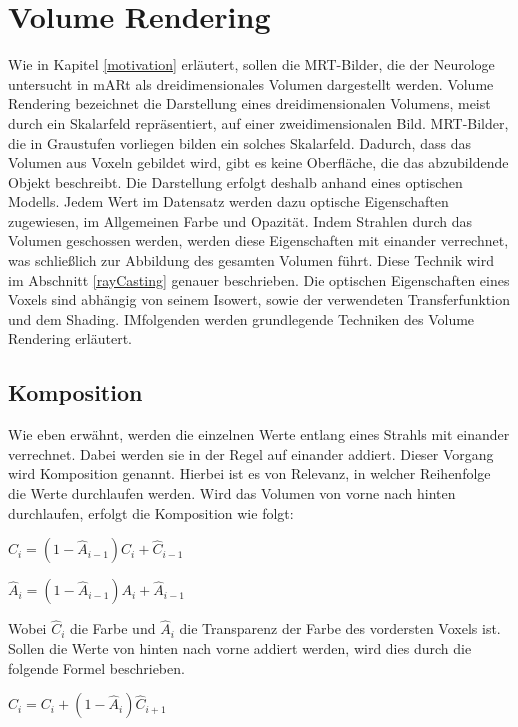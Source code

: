 \section{Volume Rendering}							  %
Wie in Kapitel \ref{motivation} erläutert, sollen die MRT-Bilder, die der Neurologe untersucht in mARt als dreidimensionales Volumen dargestellt werden. Volume Rendering bezeichnet die Darstellung eines dreidimensionalen Volumens, meist durch ein Skalarfeld repräsentiert, auf einer zweidimensionalen Bild. MRT-Bilder, die in Graustufen vorliegen bilden ein solches Skalarfeld. 
Dadurch, dass das Volumen aus Voxeln gebildet wird, gibt es keine Oberfläche, die das abzubildende Objekt beschreibt. Die Darstellung erfolgt deshalb anhand eines optischen Modells. Jedem Wert im Datensatz werden dazu optische Eigenschaften zugewiesen, im Allgemeinen Farbe und Opazität. Indem Strahlen durch das Volumen geschossen werden, werden diese Eigenschaften mit einander verrechnet, was schließlich zur Abbildung des gesamten Volumen führt. Diese Technik wird im Abschnitt \ref{rayCasting} genauer beschrieben.
Die optischen Eigenschaften eines Voxels sind abhängig von seinem Isowert, sowie der verwendeten Transferfunktion und dem Shading. 
IMfolgenden werden grundlegende Techniken des Volume Rendering erläutert.

\subsection{Komposition}

Wie eben erwähnt, werden die einzelnen Werte entlang eines Strahls mit einander verrechnet. Dabei werden sie in der Regel auf einander addiert. Dieser Vorgang wird Komposition genannt. Hierbei ist es von Relevanz, in welcher Reihenfolge die Werte durchlaufen werden. Wird das Volumen von vorne nach hinten durchlaufen, erfolgt die Komposition wie folgt:

$\hat{C}_{i}=(1-\hat{A}_{i-1})C_{i}+\hat{C}_{i-1}$

$\hat{A}_{i}=(1-\hat{A}_{i-1})A_{i}+\hat{A}_{i-1}$

Wobei $\hat{C}_{i}$ die Farbe und $\hat{A}_{i}$ die Transparenz der Farbe des vordersten Voxels ist.
Sollen die Werte von hinten nach vorne addiert werden, wird dies durch die folgende Formel beschrieben.

$\hat{C}_{i}=C_{i}+(1-\hat{A}_{i})\hat{C}_{i+1}$

